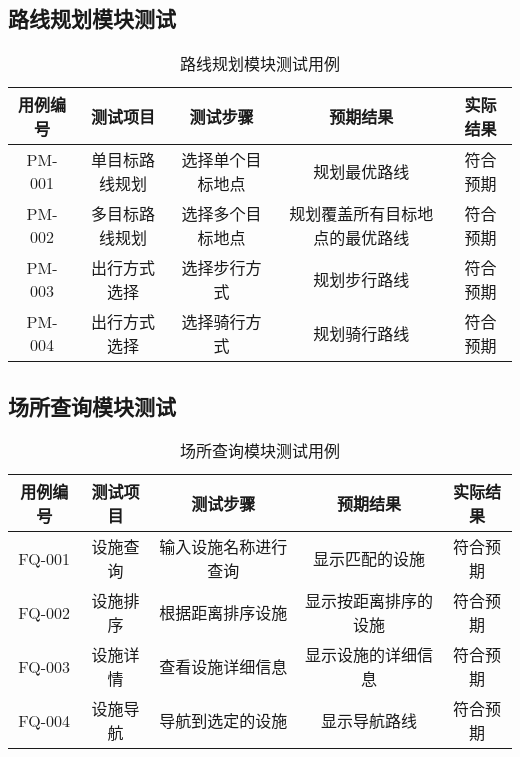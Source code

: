 \documentclass{ctexart}
\begin{document}
\subsection{路线规划模块测试}
\begin{table}[H]
    \centering
    \caption{路线规划模块测试用例}
    \begin{tabular}{|c|c|c|c|c|}
        \hline
        \textbf{用例编号} & \textbf{测试项目} & \textbf{测试步骤} & \textbf{预期结果}   & \textbf{实际结果} \\
        \hline
        PM-001        & 单目标路线规划       & 选择单个目标地点      & 规划最优路线          & 符合预期          \\
        \hline
        PM-002        & 多目标路线规划       & 选择多个目标地点      & 规划覆盖所有目标地点的最优路线 & 符合预期          \\
        \hline
        PM-003        & 出行方式选择        & 选择步行方式        & 规划步行路线          & 符合预期          \\
        \hline
        PM-004        & 出行方式选择        & 选择骑行方式        & 规划骑行路线          & 符合预期          \\
        \hline
    \end{tabular}
\end{table}

\subsection{场所查询模块测试}
\begin{table}[H]
    \centering
    \caption{场所查询模块测试用例}
    \begin{tabular}{|c|c|c|c|c|}
        \hline
        \textbf{用例编号} & \textbf{测试项目} & \textbf{测试步骤} & \textbf{预期结果} & \textbf{实际结果} \\
        \hline
        FQ-001        & 设施查询          & 输入设施名称进行查询    & 显示匹配的设施       & 符合预期          \\
        \hline
        FQ-002        & 设施排序          & 根据距离排序设施      & 显示按距离排序的设施    & 符合预期          \\
        \hline
        FQ-003        & 设施详情          & 查看设施详细信息      & 显示设施的详细信息     & 符合预期          \\
        \hline
        FQ-004        & 设施导航          & 导航到选定的设施      & 显示导航路线        & 符合预期          \\
        \hline
    \end{tabular}
\end{table}
\end{document}
